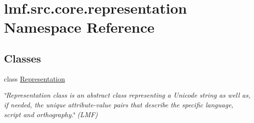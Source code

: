 \hypertarget{namespacelmf_1_1src_1_1core_1_1representation}{\section{lmf.\+src.\+core.\+representation Namespace Reference}
\label{namespacelmf_1_1src_1_1core_1_1representation}
}
\subsection*{Classes}
\begin{DoxyCompactItemize}
\item 
class \hyperlink{classlmf_1_1src_1_1core_1_1representation_1_1_representation}{Representation}
\begin{DoxyCompactList}\small\item\em \char`\"{}\+Representation class is an abstract class representing a Unicode string as well as, if needed, the unique attribute-\/value pairs that describe the specific language, script and orthography.\char`\"{} (L\+M\+F) \end{DoxyCompactList}\end{DoxyCompactItemize}
